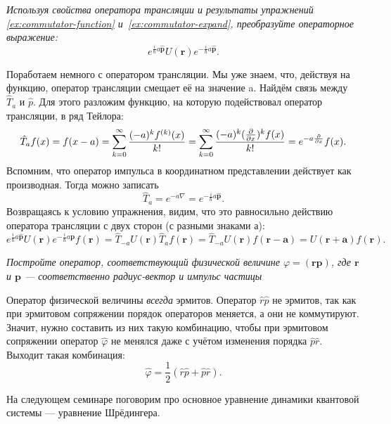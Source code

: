\begin{exercise}
  \textit{Используя свойства оператора трансляции и результаты упражнений
    \textnumero\,\ref{ex:commutator-function} и
    \textnumero\,\ref{ex:commutator-expand}, преобразуйте операторное выражение:}
  \[
    e^{\frac{i}{\hbar} a \hat{\mathbf{p}}} U(\mathbf{r}) e^{-\frac{i}{\hbar} a \hat{\mathbf{p}}}.
  \]
\end{exercise}

Поработаем немного с оператором трансляции. Мы уже знаем, что, действуя на
функцию, оператор трансляции смещает её на значение a. Найдём связь между $\hat
  T_{a}$ и $\hat{p}$. Для этого разложим функцию, на которую подействовал
оператор трансляции, в ряд Тейлора:
\[
  \hat T_{a} f(x) = f(x - a) = \sum\limits_{k=0}^{\infty} \frac{(-a)^k f^{(k)}(x)}{k!} =
  \sum\limits_{k=0}^{\infty} \frac{(-a)^k (\frac{\partial }{\partial x})^k f(x)}{k!} = e^{-a \frac{\partial }{\partial x}} f(x).
\]
Вспомним, что оператор импульса в координатном представлении действует как
производная. Тогда можно записать
\[
  \hat T_{a} = e^{-a\nabla} = e^{-\frac{i}{\hbar}a\hat{\mathbf{p}}}.
\]
Возвращаясь к условию упражнения, видим, что это равносильно действию оператора
трансляции с двух сторон (с разными знаками а):
\[
  e^{\frac{i}{\hbar} a \hat{\mathbf{p}}} U(\mathbf{r}) e^{-\frac{i}{\hbar} a \hat{\mathbf{p}}}
  f(\mathbf{r}) = \hat T_{-a} U(\mathbf{r}) \hat T_{a} f(\mathbf{r}) = \hat T_{-a}U(\mathbf{r})
  f(\mathbf{r - a}) = U(\mathbf{r + a}) f(\mathbf{r}).
\]
\qedsq
\begin{exercise}
  \textit{Постройте оператор, соответствующий физической величине $\varphi =
      (\mathbf{rp})$, где $\mathbf r$ и $\mathbf p$ --- соответственно радиус-вектор
    и импульс частицы}
\end{exercise}

Оператор физической величины \textit{всегда} эрмитов. Оператор $\hat{r}\hat{p}$
не эрмитов, так как при эрмитовом сопряжении порядок операторов меняется, а они
не коммутируют. Значит, нужно составить из них такую комбинацию, чтобы при
эрмитовом сопряжении оператор $\hat{\varphi}$ не менялся даже с учётом
изменения порядка $\hat{p} \hat{r}$. Выходит такая комбинация:
\[
  \hat{\varphi} = \frac{1}{2} (\hat{r} \hat{p} + \hat{p} \hat{r}).
\]
\qedsq

На следующем семинаре поговорим про основное уравнение динамики квантовой
системы --- уравнение Шрёдингера.
